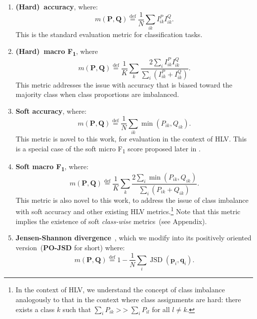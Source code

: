 \documentclass[shortpaper]{clv2025}
\newcommand{\pojsd}{PO-JSD\xspace}
\newcommand{\metric}[1]{\textbf{#1}\xspace}
\newcommand{\eqdef}{\overset{\mathrm{def}}{=}}  %
\DeclareMathOperator{\mgt}{>\!\!>}
\DeclareMathOperator{\JSD}{JSD}
\begin{document}
\begin{enumerate}
  \item \metric{(Hard)~accuracy}, where:
    \begin{equation*}
      m(\mathbf{P},\mathbf{Q})\eqdef\frac{1}{N}\sum_{ik}I^P_{ik}I^Q_{ik}.
    \end{equation*}
    This is the standard evaluation metric for classification tasks.
  \item \metric{(Hard)~macro F\textsubscript{1}}, where
    \begin{equation*}
      m(\mathbf{P},\mathbf{Q})\eqdef\frac{1}{K}\sum_{k}\frac{2\sum_{i}I^P_{ik}I^Q_{ik}}{\sum_{i}\left(I^P_{ik}+I^Q_{ik}\right)}.
    \end{equation*}
    This metric addresses the issue with accuracy
    that is biased toward the majority class when class proportions are
    imbalanced.
  \item \metric{Soft accuracy}, where:
    \begin{equation*}
      m(\mathbf{P},\mathbf{Q})\eqdef\frac{1}{N}\sum_{ik}\min(P_{ik},Q_{ik}).
    \end{equation*}
    This metric is novel to this work, for evaluation in the context of HLV.
    This is a special case of the soft micro F\textsubscript{1} score proposed
    later in .
  \item \metric{Soft macro F\textsubscript{1}}, where:
    \begin{equation*}
      m(\mathbf{P},\mathbf{Q})\eqdef\frac{1}{K}\sum_{k}\frac{2\sum_{i}\min(P_{ik},Q_{ik})}{\sum_{i}(P_{ik}+Q_{ik})}.
    \end{equation*}
    This metric is also novel to this work, to address the issue of class imbalance with
    soft accuracy and other existing HLV metrics.\footnote{In the
      context of HLV, we understand the concept of class imbalance
      analogously to that in the context where class assignments are
      hard: there exists a class $k$ such that
      $\sum_{i}P_{ik}\mgt\sum_{i}P_{il}$ for all $l\neq k$.
    } Note that this metric implies the existence of soft
    \emph{class-wise} metrics~(see Appendix).
  \item \metric{Jensen-Shannon divergence}~\citep{uma2021}, which we modify into its
    positively oriented version~(\metric{\pojsd} for short) where:
    \begin{equation*}
      m(\mathbf{P},\mathbf{Q})\eqdef1-\frac{1}{N}\sum_{i}\JSD(\mathbf{p}_i,\mathbf{q}_i).
    \end{equation*}

\end{enumerate}
\end{document}
